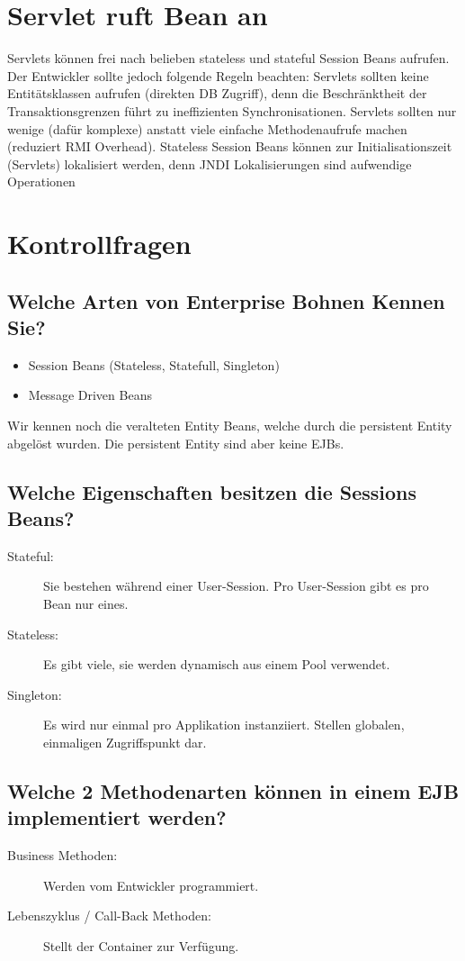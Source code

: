 \section{Servlet ruft Bean an}
Servlets können frei nach belieben stateless und stateful Session Beans aufrufen. Der Entwickler sollte jedoch folgende Regeln beachten: Servlets sollten keine Entitätsklassen aufrufen (direkten DB Zugriff), denn die Beschränktheit der
Transaktionsgrenzen führt zu ineffizienten Synchronisationen. Servlets sollten nur wenige (dafür komplexe) anstatt viele einfache Methodenaufrufe machen (reduziert RMI Overhead). Stateless Session Beans können zur Initialisationszeit (Servlets) lokalisiert werden, denn JNDI Lokalisierungen sind aufwendige Operationen 

\section{Kontrollfragen}

\subsection{Welche Arten von Enterprise Bohnen Kennen Sie?}
\begin{itemize}
	\item Session Beans (Stateless, Statefull, Singleton)
	\item Message Driven Beans
\end{itemize}
Wir kennen noch die veralteten Entity Beans, welche durch die persistent Entity abgelöst wurden. Die persistent Entity sind aber keine EJBs.

\subsection{Welche Eigenschaften besitzen die Sessions Beans?}
\begin{description}
	\item[Stateful:] Sie bestehen während einer User-Session. Pro User-Session gibt es pro Bean nur eines.
	\item[Stateless:] Es gibt viele, sie werden dynamisch aus einem Pool verwendet. 
	\item[Singleton:] Es wird nur einmal pro Applikation instanziiert. Stellen globalen, einmaligen Zugriffspunkt dar.
\end{description}

\subsection{Welche 2 Methodenarten können in einem EJB implementiert werden?}
\begin{description}
	\item[Business Methoden:] Werden vom Entwickler programmiert.
	\item[Lebenszyklus / Call-Back Methoden:] Stellt der Container zur Verfügung. 
\end{description}

